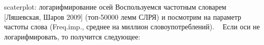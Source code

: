 \begin{frame}{scaterplot: логарифмирование осей}
Воспользуемся частотным словарем [Ляшевская, Шаров 2009] (топ-50000 лемм СЛРЯ) и посмотрим на параметр частоты слова (Freq.imp., среднее на миллион словоупотреблений).
\
Если оси не логарифмировать, то получится следующее:
\begin{multicols}{2}
\end{multicols}
\end{frame}
